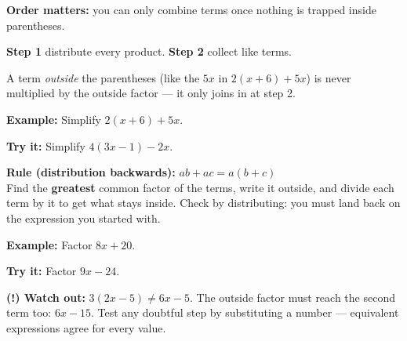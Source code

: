 \documentclass[12pt]{article}
\begin{document}

\begin{formulabox}
\textbf{Order matters:} you can only combine terms once nothing is trapped
inside parentheses.\par
\textbf{Step 1} distribute every product. \quad \textbf{Step 2} collect like terms.\par
A term \emph{outside} the parentheses (like the $5x$ in $2(x+6) + 5x$) is never
multiplied by the outside factor --- it only joins in at step 2.
\end{formulabox}

\begin{examplebox}
\textbf{Example:} \quad Simplify $2(x + 6) + 5x$.
\end{examplebox}

\begin{tryitbox}
\textbf{Try it:} \quad Simplify $4(3x - 1) - 2x$.\\[2pt]
\end{tryitbox}


\begin{formulabox}
\textbf{Rule (distribution backwards):} \quad $ab + ac = a(b + c)$\\[3pt]
Find the \textbf{greatest} common factor of the terms, write it outside, and
divide each term by it to get what stays inside. Check by distributing: you must
land back on the expression you started with.
\end{formulabox}

\begin{examplebox}
\textbf{Example:} \quad Factor $8x + 20$.
\end{examplebox}

\begin{tryitbox}
\textbf{Try it:} \quad Factor $9x - 24$.\\[2pt]
\end{tryitbox}

\begin{watchoutbox}
\textbf{(!) Watch out:} $3(2x - 5) \neq 6x - 5$. The outside factor must reach
the second term too: $6x - 15$. Test any doubtful step by substituting a number
--- equivalent expressions agree for every value.
\end{watchoutbox}
\end{document}
